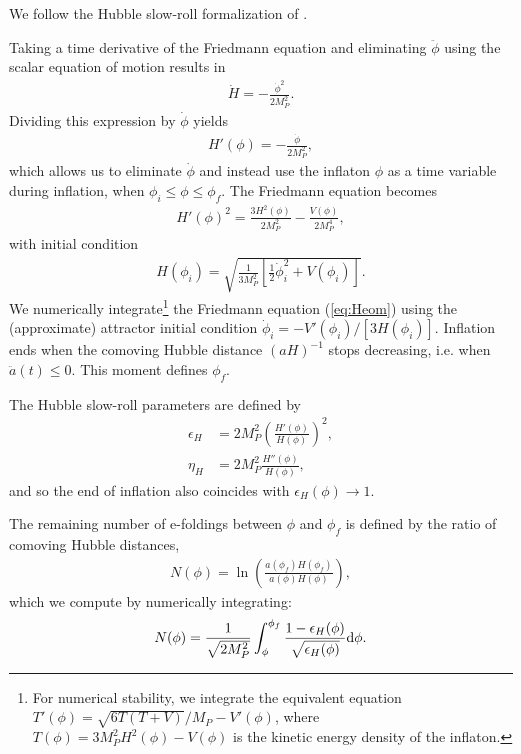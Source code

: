 \documentclass[aps,amsfonts,amsmath,prd,preprint,nofootinbib]{revtex4}
\newcommand{\Mp}{{M_{P}}}
\newcommand{\MMp}{{M_P^2}}
\newcommand{\rmd}{{\rm d}}
\begin{document}
We follow the Hubble slow-roll formalization of \cite{Liddle:1994dx}.  


Taking a time derivative of the Friedmann equation 
and eliminating $\ddot \phi$ using the scalar equation of motion results in
\begin{align}
\dot H = -\frac{\dot \phi^2}{2\MMp}.
\end{align}
Dividing this expression by $\dot\phi$ yields
\begin{align}\label{eq:phidot}
H'(\phi) = -\frac{\dot \phi}{2\MMp},
\end{align}
which allows us to eliminate $\dot \phi$ and instead use
the inflaton $\phi$ as a time variable during inflation, when $\phi_i \leq \phi \leq \phi_f$.  The Friedmann equation becomes
\begin{align}\label{eq:Heom}
H'(\phi)^2 = \frac{3 H^2(\phi)}{2\MMp} - \frac{V(\phi)}{2 M^4_P},
\end{align}
with initial condition
\begin{align}
H(\phi_i) = \sqrt{\frac{1}{3\MMp}\left[\tfrac{1}{2}\dot \phi_i^2 + V(\phi_i)  \right]}.
\end{align}
We numerically integrate\footnote{For numerical stability, we integrate the equivalent equation $T'(\phi) = \sqrt{6T\left(T+V\right)}/\Mp - V'(\phi)$, where $T(\phi) = 3\MMp H^2(\phi) - V(\phi)$ is the kinetic energy density of the inflaton.}
the Friedmann equation (\ref{eq:Heom}) using the (approximate) attractor initial condition ${\dot \phi_i = -V'(\phi_i)/[3H(\phi_i)]}$.  Inflation ends when the 
comoving Hubble distance $\left(a H\right)^{-1}$ stops decreasing, i.e. when ${\ddot a(t) \leq 0}$.  This moment defines $\phi_f$. 

The Hubble slow-roll parameters are defined by
\begin{align}
\epsilon_H &= 2\MMp \left(\frac{H'(\phi)}{H(\phi)}\right)^2,\\
\eta_H &= 2\MMp \frac{H''(\phi)}{H(\phi)},
\end{align}
and so the end of inflation also coincides with ${\epsilon_H(\phi) \to 1}$.  

The remaining number of e-foldings between $\phi$ and $\phi_f$ is defined by the ratio of comoving Hubble distances, 
\begin{align}
N(\phi) = \ln\left(\frac{a(\phi_f) H(\phi_f)}{a(\phi) H(\phi)}\right),
\end{align}
which we compute by numerically integrating:
\begin{align}
N(\phi) = \frac{1}{\sqrt{2\MMp}}\int_{\phi}^{\phi_f} \frac{1-\epsilon_H(\phi)}{\sqrt{\epsilon_H(\phi)}}\rmd \phi .
\end{align}
\end{document}
